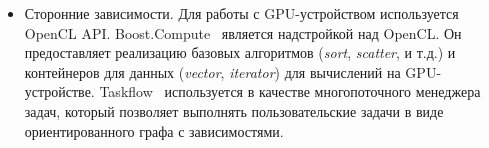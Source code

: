 \begin{itemize}
    \item Сторонние зависимости. Для работы с GPU-устройством используется OpenCL API. Boost.Compute~\cite{article:boost_compute} является надстройкой над OpenCL. Он предоставляет реализацию базовых алгоритмов (\textit{sort}, \textit{scatter}, и т.д.) и контейнеров для данных (\textit{vector}, \textit{iterator}) для вычислений на GPU-устройстве. Taskflow~\cite{article:taskflow} используется в качестве многопоточного менеджера задач, который позволяет выполнять пользовательские задачи в виде ориентированного графа с зависимостями. 
\end{itemize}